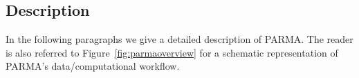 
\subsection{Description}
In the following paragraphs we give a detailed description of PARMA. The reader
is also referred to Figure~\ref{fig:parmaoverview} for a schematic representation of
PARMA's data/computational workflow.

